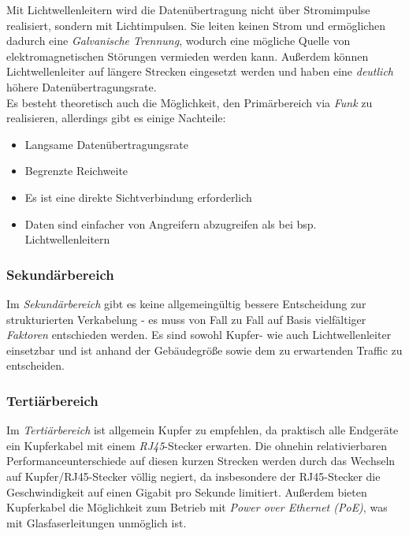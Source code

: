 \documentclass[a4paper, 12pt]{report}
\begin{document}
Mit Lichtwellenleitern wird die Datenübertragung nicht über Stromimpulse
realisiert, sondern mit Lichtimpulsen. Sie leiten keinen Strom und ermöglichen 
dadurch eine \emph{Galvanische Trennung}, wodurch eine mögliche Quelle von
elektromagnetischen Störungen vermieden werden kann. Außerdem können 
Lichtwellenleiter auf längere Strecken eingesetzt werden und haben eine 
\emph{deutlich} höhere Datenübertragungsrate. \\

Es besteht theoretisch auch die Möglichkeit, den Primärbereich via \emph{Funk}
zu realisieren, allerdings gibt es einige Nachteile: 

\begin{itemize}
    \item Langsame Datenübertragungsrate
    \item Begrenzte Reichweite
    \item Es ist eine direkte Sichtverbindung erforderlich
    \item Daten sind einfacher von Angreifern abzugreifen als bei bsp. 
        Lichtwellenleitern
\end{itemize}

\newpage
\subsubsection{Sekundärbereich}

Im \emph{Sekundärbereich} gibt es keine allgemeingültig bessere Entscheidung
zur strukturierten Verkabelung - es muss von Fall zu Fall auf Basis vielfältiger 
\emph{Faktoren} entschieden werden. Es sind sowohl Kupfer- wie auch 
Lichtwellenleiter einsetzbar und ist anhand der Gebäudegröße sowie dem zu
erwartenden Traffic zu entscheiden.

\subsubsection{Tertiärbereich}

Im \emph{Tertiärbereich} ist allgemein Kupfer zu empfehlen, da praktisch alle 
Endgeräte ein Kupferkabel mit einem \emph{RJ45}-Stecker erwarten. Die ohnehin 
relativierbaren Performanceunterschiede auf diesen kurzen Strecken werden 
durch das Wechseln auf Kupfer/RJ45-Stecker völlig negiert, da insbesondere der
RJ45-Stecker die Geschwindigkeit auf einen Gigabit pro Sekunde limitiert. 
Außerdem bieten Kupferkabel die Möglichkeit zum Betrieb mit 
\emph{Power over Ethernet (PoE)}, was mit Glasfaserleitungen unmöglich ist. 
\end{document}
